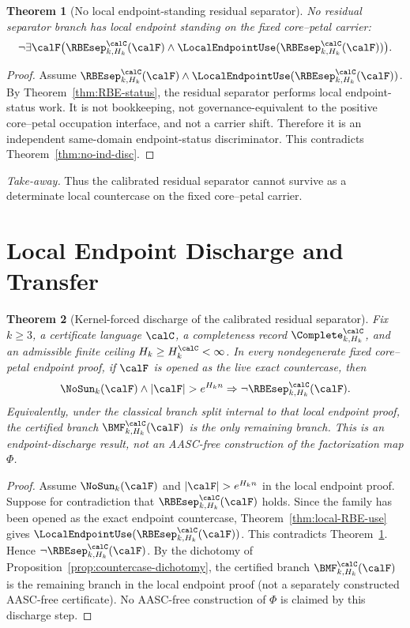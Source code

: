 \documentclass[11pt]{article}
\newtheorem{theorem}{Theorem}[section]
\begin{document}
\begin{theorem}[No local endpoint-standing residual separator]\label{thm:no-RBEsep}
No residual separator branch has local endpoint standing on the fixed core--petal carrier:
\[
  \neg\exists\calF\bigl(\RBEsep^{\calC}_{k,H_k}(\calF)\wedge \LocalEndpointUse(\RBEsep^{\calC}_{k,H_k}(\calF))\bigr).
\]
\end{theorem}

\begin{proof}
Assume \(\RBEsep^{\calC}_{k,H_k}(\calF)\wedge \LocalEndpointUse(\RBEsep^{\calC}_{k,H_k}(\calF))\).  By Theorem~\ref{thm:RBE-status}, the residual separator performs local endpoint-status work.  It is not bookkeeping, not governance-equivalent to the positive core--petal occupation interface, and not a carrier shift.  Therefore it is an independent same-domain endpoint-status discriminator.  This contradicts Theorem~\ref{thm:no-ind-disc}.
\end{proof}

\noindent\emph{Take-away.} Thus the calibrated residual separator cannot survive as a determinate local countercase on the fixed core--petal carrier.

\section{Local Endpoint Discharge and Transfer}

\begin{theorem}[Kernel-forced discharge of the calibrated residual separator]\label{thm:transfer}
Fix \(k\ge3\), a certificate language \(\calC\), a completeness record \(\Complete^{\calC}_{k,H_k}\), and an admissible finite ceiling \(H_k\ge H_k^{\calC}<\infty\).  In every nondegenerate fixed core--petal endpoint proof, if \(\calF\) is opened as the live exact countercase, then
\[
  \NoSun_k(\calF)\wedge |\calF|>e^{H_k n}
  \Rightarrow
  \neg \RBEsep^{\calC}_{k,H_k}(\calF).
\]
Equivalently, under the classical branch split internal to that local endpoint proof, the certified branch \(\BMF^{\calC}_{k,H_k}(\calF)\) is the only remaining branch.  This is an endpoint-discharge result, not an AASC-free construction of the factorization map \(\Phi\).
\end{theorem}

\begin{proof}
Assume \(\NoSun_k(\calF)\) and \(|\calF|>e^{H_k n}\) in the local endpoint proof.  Suppose for contradiction that \(\RBEsep^{\calC}_{k,H_k}(\calF)\) holds.  Since the family has been opened as the exact endpoint countercase, Theorem~\ref{thm:local-RBE-use} gives \(\LocalEndpointUse(\RBEsep^{\calC}_{k,H_k}(\calF))\).  This contradicts Theorem~\ref{thm:no-RBEsep}.  Hence \(\neg\RBEsep^{\calC}_{k,H_k}(\calF)\).  By the dichotomy of Proposition~\ref{prop:countercase-dichotomy}, the certified branch \(\BMF^{\calC}_{k,H_k}(\calF)\) is the remaining branch in the local endpoint proof (not a separately constructed AASC-free certificate).  No AASC-free construction of \(\Phi\) is claimed by this discharge step.
\end{proof}
\end{document}
